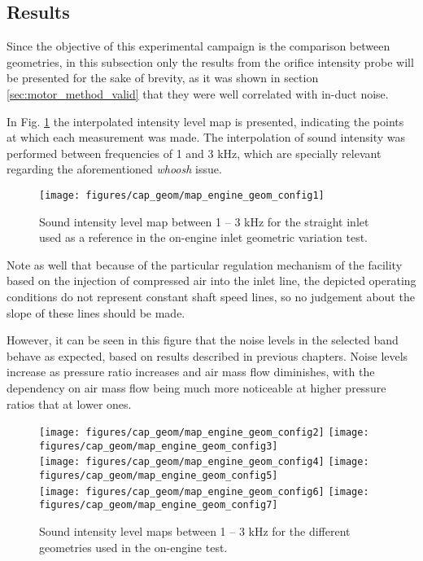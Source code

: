 \subsection{Results}

Since the objective of this experimental campaign is the comparison between geometries, in this subsection only the results from the orifice intensity probe will be presented for the sake of brevity, as it was shown in section \ref{sec:motor_method_valid} that they were well correlated with in-duct noise.

In Fig. \ref{fig:geom_mot_comparison_map1} the interpolated intensity level map is presented, indicating the points at which each measurement was made. The interpolation of sound intensity was performed between frequencies of 1 and 3 kHz, which are specially relevant regarding the aforementioned \emph{whoosh} issue.

\begin{figure}[htb!]
\centering
\texttt{[image: figures/cap\_geom/map\_engine\_geom\_config1]}
\caption[SIL map in the 1 -- 3 kHz band (straight)]{Sound intensity level map between 1 -- 3 kHz for the straight inlet used as a reference in the on-engine inlet geometric variation test.}
\label{fig:geom_mot_comparison_map1}
\end{figure}

Note as well that because of the particular regulation mechanism of the facility based on the injection of compressed air into the inlet line, the depicted operating conditions do not represent constant shaft speed lines, so no judgement about the slope of these lines should be made.

However, it can be seen in this figure that the noise levels in the selected band behave as expected, based on results described in previous chapters. Noise levels increase as pressure ratio increases and air mass flow diminishes, with the dependency on air mass flow being much more noticeable at higher pressure ratios that at lower ones.

\begin{figure}[htb!]
\centering
\texttt{[image: figures/cap\_geom/map\_engine\_geom\_config2]}\hspace{0.05\textwidth}
\texttt{[image: figures/cap\_geom/map\_engine\_geom\_config3]}\\[2mm]
\texttt{[image: figures/cap\_geom/map\_engine\_geom\_config4]}\hspace{0.05\textwidth}
\texttt{[image: figures/cap\_geom/map\_engine\_geom\_config5]}\\[2mm]
\texttt{[image: figures/cap\_geom/map\_engine\_geom\_config6]}\hspace{0.05\textwidth}
\texttt{[image: figures/cap\_geom/map\_engine\_geom\_config7]}
\caption[SIL maps in the 1 -- 3 kHz band (comparison)]{Sound intensity level maps between 1 -- 3 kHz for the different geometries used in the on-engine test.}
\label{fig:geom_mot_comparison_maps}
\end{figure}

